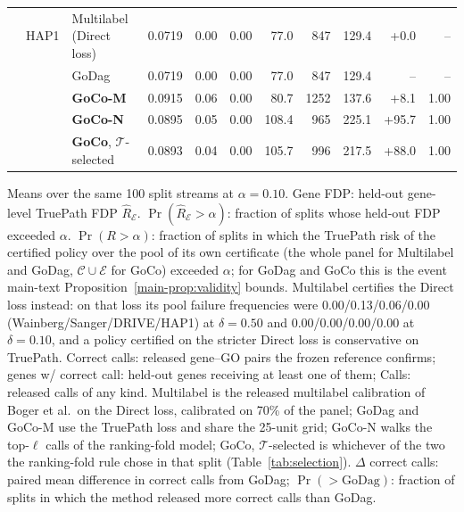 \begin{table}[htbp]
{\begin{tabular}{lll rrr rrr r r}
 & HAP1 & Multilabel (Direct loss) & 0.0719 & 0.00 & 0.00 & 77.0 & 847 & 129.4 & +0.0 & -- \\
 &  & GoDag & 0.0719 & 0.00 & 0.00 & 77.0 & 847 & 129.4 & -- & -- \\
 &  & \textbf{GoCo-M} & 0.0915 & 0.06 & 0.00 & 80.7 & 1252 & 137.6 & +8.1 & 1.00 \\
 &  & \textbf{GoCo-N} & 0.0895 & 0.05 & 0.00 & 108.4 & 965 & 225.1 & +95.7 & 1.00 \\
 &  & \textbf{GoCo}, $\mathcal T$-selected & 0.0893 & 0.04 & 0.00 & 105.7 & 996 & 217.5 & +88.0 & 1.00 \\
\bottomrule
\end{tabular}}
\par\vspace{3pt}\begin{minipage}{\linewidth}\footnotesize Means over the same 100 split streams at $\alpha=0.10$. Gene FDP: held-out gene-level TruePath FDP $\widehat R_{\mathcal E}$. $\Pr(\widehat R_{\mathcal E}>\alpha)$: fraction of splits whose held-out FDP exceeded $\alpha$. $\Pr(R>\alpha)$: fraction of splits in which the TruePath risk of the certified policy over the pool of its own certificate (the whole panel for Multilabel and GoDag, $\mathcal C\cup\mathcal E$ for GoCo) exceeded $\alpha$; for GoDag and GoCo this is the event main-text Proposition~\ref{main-prop:validity} bounds. Multilabel certifies the Direct loss instead: on that loss its pool failure frequencies were 0.00/0.13/0.06/0.00 (Wainberg/Sanger/DRIVE/HAP1) at $\delta=0.50$ and 0.00/0.00/0.00/0.00 at $\delta=0.10$, and a policy certified on the stricter Direct loss is conservative on TruePath. Correct calls: released gene--GO pairs the frozen reference confirms; genes w/ correct call: held-out genes receiving at least one of them; Calls: released calls of any kind. Multilabel is the released multilabel calibration of Boger et al.\ on the Direct loss, calibrated on 70\% of the panel; GoDag and GoCo-M use the TruePath loss and share the 25-unit grid; GoCo-N walks the top-$\ell$ calls of the ranking-fold model; GoCo, $\mathcal T$-selected is whichever of the two the ranking-fold rule chose in that split (Table~\ref{tab:selection}). $\Delta$ correct calls: paired mean difference in correct calls from GoDag; $\Pr(>\text{GoDag})$: fraction of splits in which the method released more correct calls than GoDag.\end{minipage}
\end{table}
